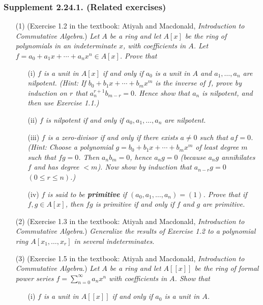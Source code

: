 \documentclass{article}
\begin{document}
\subsubsection*{Supplement 2.24.1. (Related exercises)}
\begin{enumerate}
\item[(1)]
  (Exercise 1.2 in the textbook: Atiyah and Macdonald, \emph{Introduction to Commutative Algebra}.)
  \emph{Let $A$ be a ring and
  let $A[x]$ be the ring of polynomials in an indeterminate $x$,
  with coefficients in $A$.
  Let $f = a_0 + a_1 x + \cdots + a_n x^n \in A[x]$.
  Prove that}
  \begin{enumerate}
  \item[(i)]
    \emph{$f$ is a unit in $A[x]$ if and only if
    $a_0$ is a unit in $A$ and
    $a_1, \ldots, a_n$ are nilpotent.
    (Hint: If $b_0 + b_1 x + \cdots + b_m x^m$ is the inverse of $f$,
    prove by induction on $r$ that $a_n^{r+1} b_{m-r} = 0$.
    Hence show that $a_n$ is nilpotent, and then use Exercise 1.1.)}

  \item[(ii)]
    \emph{$f$ is nilpotent if and only if
    $a_0, a_1, \ldots, a_n$ are nilpotent.}

  \item[(iii)]
    \emph{$f$ is a zero-divisor if and only if
    there exists $a \neq 0$ such that $af = 0$.
    (Hint: Choose a polynomial $g = b_0 + b_1 x + \cdots + b_m x^m$
    of least degree $m$ such that $fg = 0$.
    Then $a_n b_m = 0$, hence $a_n g = 0$
    (because $a_n g$ annihilates $f$ and has degree $< m$).
    Now show by induction that $a_{n-r}g = 0$ $(0 \leq r \leq n)$.)}

  \item[(iv)]
    \emph{$f$ is said to be \textbf{primitive} if $(a_0, a_1, \ldots, a_n) = (1)$.
    Prove that if $f, g \in A[x]$, then $fg$ is primitive if and only if
    $f$ and $g$ are primitive.} \\
  \end{enumerate}

\item[(2)]
  (Exercise 1.3 in the textbook: Atiyah and Macdonald, \emph{Introduction to Commutative Algebra}.)
  \emph{Generalize the results of Exercise 1.2 to a polynomial ring
  $A[x_1, \ldots, x_r]$ in several indeterminates.} \\

\item[(3)]
  (Exercise 1.5 in the textbook: Atiyah and Macdonald, \emph{Introduction to Commutative Algebra}.)
  \emph{Let $A$ be a ring and let $A[[x]]$ be the ring of formal power series
  $f = \sum_{n=0}^{\infty} a_n x^n$ with coefficients in $A$. Show that}
  \begin{enumerate}
  \item[(i)]
    \emph{$f$ is a unit in $A[[x]]$ if and only if $a_0$ is a unit in $A$.}


\end{enumerate}
\end{enumerate}
\end{document}
